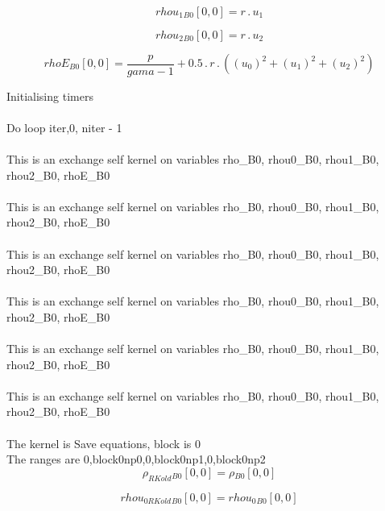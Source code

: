 \documentclass{article}
\begin{document}
\begin{dmath}{rhou_{1}{_{B0}}}[{0,0}] = r \,.\, u_{1}\end{dmath}

\begin{dmath}{rhou_{2}{_{B0}}}[{0,0}] = r \,.\, u_{2}\end{dmath}

\begin{dmath}{rhoE{_{B0}}}[{0,0}] = \frac{p}{gama - 1} + 0.5 \,.\, r \,.\, \left(\left(u_{0} \right)^{2} + \left(u_{1} \right)^{2} + \left(u_{2} \right)^{2}\right)\end{dmath}

\noindent Initialising timers\\
\\\noindent Do loop iter,0, niter - 1\\
\\\noindent This is an exchange self kernel on variables rho_B0, rhou0_B0, rhou1_B0, rhou2_B0, rhoE_B0\\\\\noindent This is an exchange self kernel on variables rho_B0, rhou0_B0, rhou1_B0, rhou2_B0, rhoE_B0\\\\\noindent This is an exchange self kernel on variables rho_B0, rhou0_B0, rhou1_B0, rhou2_B0, rhoE_B0\\\\\noindent This is an exchange self kernel on variables rho_B0, rhou0_B0, rhou1_B0, rhou2_B0, rhoE_B0\\\\\noindent This is an exchange self kernel on variables rho_B0, rhou0_B0, rhou1_B0, rhou2_B0, rhoE_B0\\\\\noindent This is an exchange self kernel on variables rho_B0, rhou0_B0, rhou1_B0, rhou2_B0, rhoE_B0\\\\\noindent The kernel is Save equations, block is 0\\\noindent The ranges are 0,block0np0,0,block0np1,0,block0np2\\\begin{dmath}{\rho_{RKold}{_{B0}}}[{0,0}] = {\rho{_{B0}}}[{0,0}]\end{dmath}

\begin{dmath}{rhou_{0 RKold}{_{B0}}}[{0,0}] = {rhou_{0}{_{B0}}}[{0,0}]\end{dmath}
\end{document}
